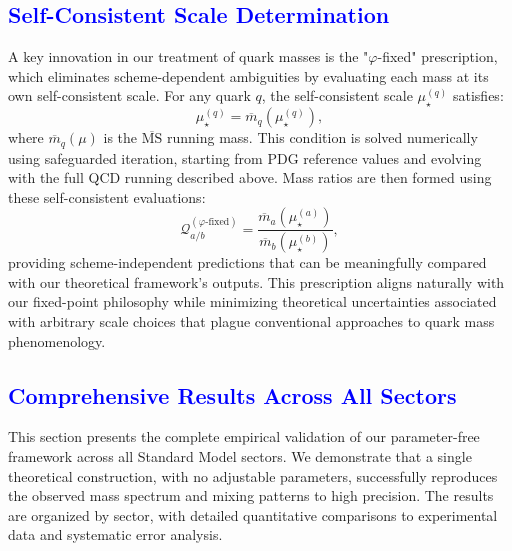 \documentclass[%
amsmath,amssymb,
aps,
prb,
floatfix, showkeys, 10pt,
]{revtex4-2}
\newcommand{\modif}[1]{\textcolor{blue}{#1}}
\begin{document}
{\modif{  \subsection{Self-Consistent Scale Determination}
\label{subsec:self_consistent_scales}  }}
A key innovation in our treatment of quark masses is the "$\varphi$-fixed" prescription, which eliminates scheme-dependent ambiguities by evaluating each mass at its own self-consistent scale. For any quark $q$, the self-consistent scale $\mu_\star^{(q)}$ satisfies:
\begin{equation}
\mu_\star^{(q)} = \overline{m}_q(\mu_\star^{(q)}),
\label{eq:self_consistent_scale}
\end{equation}
where $\overline{m}_q(\mu)$ is the $\overline{\text{MS}}$ running mass. This condition is solved numerically using safeguarded iteration, starting from PDG reference values and evolving with the full QCD running described above. 
Mass ratios are then formed using these self-consistent evaluations:
\begin{equation}
\mathcal{Q}_{a/b}^{(\varphi\text{-fixed})} = \frac{\overline{m}_a(\mu_\star^{(a)})}{\overline{m}_b(\mu_\star^{(b)})},
\label{eq:phi_fixed_ratio}
\end{equation}
providing scheme-independent predictions that can be meaningfully compared with our theoretical framework's outputs.
This prescription aligns naturally with our fixed-point philosophy while minimizing theoretical uncertainties associated with arbitrary scale choices that plague conventional approaches to quark mass phenomenology.














{\modif{\section{Comprehensive Results Across All Sectors}
\label{sec:results} }}
This section presents the complete empirical validation of our parameter-free framework across all Standard Model sectors. We demonstrate that a single theoretical construction, with no adjustable parameters, successfully reproduces the observed mass spectrum and mixing patterns to high precision. The results are organized by sector, with detailed quantitative comparisons to experimental data and systematic error analysis.
\end{document}
